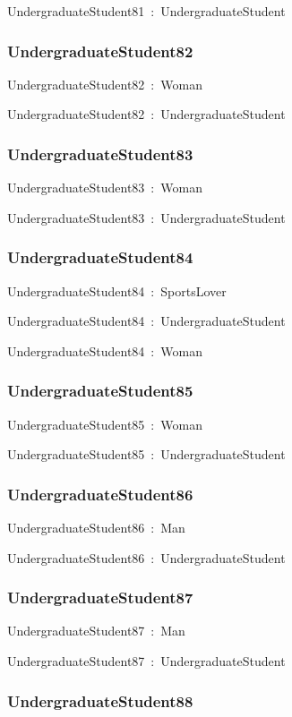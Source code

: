 \documentclass{article}
\begin{document}
UndergraduateStudent81~:~UndergraduateStudent

\subsubsection*{UndergraduateStudent82}

UndergraduateStudent82~:~Woman

UndergraduateStudent82~:~UndergraduateStudent

\subsubsection*{UndergraduateStudent83}

UndergraduateStudent83~:~Woman

UndergraduateStudent83~:~UndergraduateStudent

\subsubsection*{UndergraduateStudent84}

UndergraduateStudent84~:~SportsLover

UndergraduateStudent84~:~UndergraduateStudent

UndergraduateStudent84~:~Woman

\subsubsection*{UndergraduateStudent85}

UndergraduateStudent85~:~Woman

UndergraduateStudent85~:~UndergraduateStudent

\subsubsection*{UndergraduateStudent86}

UndergraduateStudent86~:~Man

UndergraduateStudent86~:~UndergraduateStudent

\subsubsection*{UndergraduateStudent87}

UndergraduateStudent87~:~Man

UndergraduateStudent87~:~UndergraduateStudent

\subsubsection*{UndergraduateStudent88}
\end{document}
